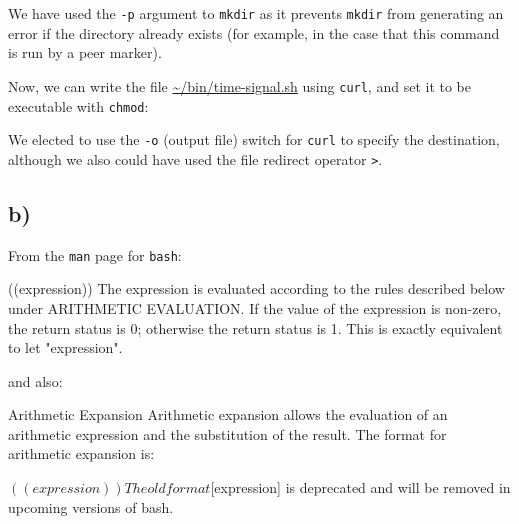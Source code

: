 \documentclass{article}
\begin{document}
We have used the \texttt{-p} argument to \texttt{mkdir} as it prevents \texttt{mkdir} from generating an error if the directory already exists (for example, in the case that this command is run by a peer marker).

Now, we can write the file \url{~/bin/time-signal.sh} using \texttt{curl}, and set it to be executable with \texttt{chmod}:


We elected to use the \texttt{-o} (output file) switch for \texttt{curl} to specify the destination, although we also could have used the file redirect operator \texttt{>}. 

\subsection{b)}

From the \texttt{man} page for \texttt{bash}:

\begin{bashinline}
((expression))
      The expression is evaluated according to the rules described below under ARITHMETIC EVALUATION.  If the value of the expression is non-zero, the return status is 0; otherwise the return  status is 1.  This is exactly equivalent to let "expression".
\end{bashinline}

and also:

\begin{bashinline}
Arithmetic Expansion
    Arithmetic expansion allows the evaluation of an arithmetic expression and the substitution of the result.  The format for arithmetic expansion is:

        $((expression))

    The old format $[expression] is deprecated and will be removed in upcoming versions of bash.
\end{bashinline}
\end{document}
